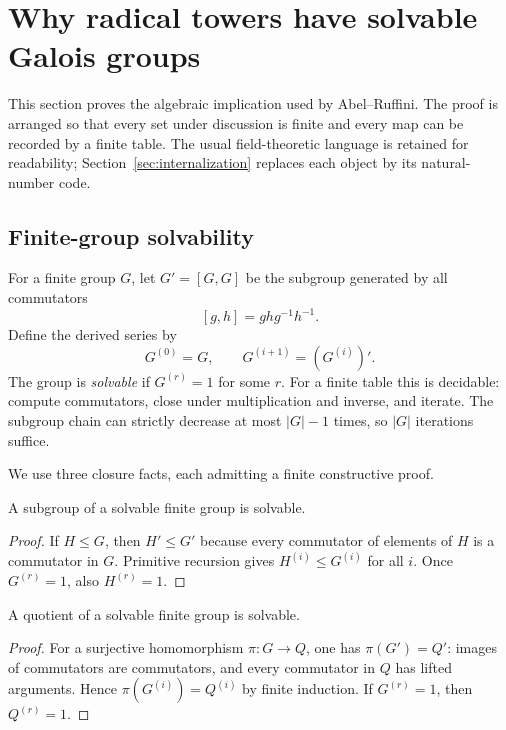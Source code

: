 \section{Why radical towers have solvable Galois groups}
\label{sec:radical-solvable}

This section proves the algebraic implication used by Abel--Ruffini.  The proof
is arranged so that every set under discussion is finite and every map can be
recorded by a finite table.  The usual field-theoretic language is retained
for readability; Section~\ref{sec:internalization} replaces each object by its
natural-number code.

\subsection{Finite-group solvability}

For a finite group $G$, let $G'=[G,G]$ be the subgroup generated by all
commutators
\[
 [g,h]=ghg^{-1}h^{-1}.
\]
Define the derived series by
\[
 G^{(0)}=G,
 \qquad
 G^{(i+1)}=(G^{(i)})'.
\]
The group is \emph{solvable} if $G^{(r)}=1$ for some $r$.
For a finite table this is decidable: compute commutators, close under
multiplication and inverse, and iterate.  The subgroup chain can strictly
decrease at most $|G|-1$ times, so $|G|$ iterations suffice.

We use three closure facts, each admitting a finite constructive proof.

\begin{lemma}[Subgroups]
A subgroup of a solvable finite group is solvable.
\end{lemma}

\begin{proof}
If $H\le G$, then $H'\le G'$ because every commutator of elements of $H$ is a
commutator in $G$.  Primitive recursion gives $H^{(i)}\le G^{(i)}$ for all
$i$.  Once $G^{(r)}=1$, also $H^{(r)}=1$.
\end{proof}

\begin{lemma}[Quotients]
A quotient of a solvable finite group is solvable.
\end{lemma}

\begin{proof}
For a surjective homomorphism $\pi:G\to Q$, one has
$\pi(G')=Q'$: images of commutators are commutators, and every commutator in
$Q$ has lifted arguments.  Hence $\pi(G^{(i)})=Q^{(i)}$ by finite induction.
If $G^{(r)}=1$, then $Q^{(r)}=1$.
\end{proof}

